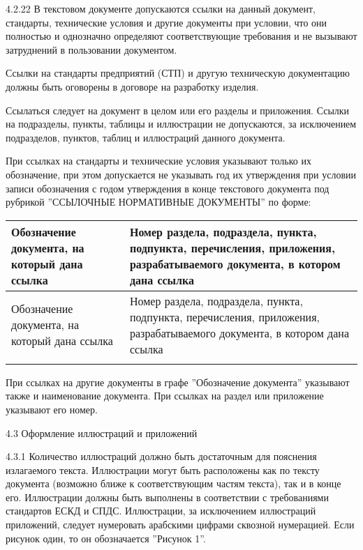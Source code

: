 4.2.22 В текстовом документе допускаются ссылки на данный документ, стандарты, технические условия и другие документы при условии, что они полностью и однозначно определяют соответствующие требования и не вызывают затруднений в пользовании документом.

Ссылки на стандарты предприятий (СТП) и другую техническую документацию должны быть оговорены в договоре на разработку изделия.

Ссылаться следует на документ в целом или его разделы и приложения. Ссылки на подразделы, пункты, таблицы и иллюстрации не допускаются, за исключением подразделов, пунктов, таблиц и иллюстраций данного документа.

При ссылках на стандарты и технические условия указывают только их обозначение, при этом допускается не указывать год их утверждения при условии записи обозначения с годом утверждения в конце текстового документа под рубрикой ''ССЫЛОЧНЫЕ НОРМАТИВНЫЕ ДОКУМЕНТЫ'' по форме:

\begin{longtable}{|p{60mm}|p{100mm}|}
  \hline
  \multicolumn{1}{|p{60mm}|}{\centering Обозначение документа, на который дана
ссылка} &
  \multicolumn{1}{p{100mm}|}{\centering Номер раздела, подраздела, пункта, подпункта, перечисления, приложения, разрабатываемого документа, в котором дана ссылка} \\\hline
  \endfirsthead
 \hline
  \multicolumn{1}{|p{60mm}|}{\centering Обозначение документа, на который дана
ссылка} &
  \multicolumn{1}{p{100mm}|}{\centering Номер раздела, подраздела, пункта, подпункта, перечисления, приложения, разрабатываемого документа, в котором дана ссылка} \\\hline
  \endhead
       &      \\ 
\end{longtable}

При ссылках на другие документы в графе ''Обозначение документа'' указывают также и наименование документа. При ссылках на раздел или приложение указывают его номер.

4.3 Оформление иллюстраций и приложений

4.3.1 Количество иллюстраций должно быть достаточным для пояснения излагаемого текста. Иллюстрации могут быть расположены как по тексту документа (возможно ближе к соответствующим частям текста), так и в конце его. Иллюстрации должны быть выполнены в соответствии с требованиями стандартов ЕСКД и СПДС.
Иллюстрации, за исключением иллюстраций приложений, следует нумеровать арабскими цифрами сквозной нумерацией. Если рисунок один, то он обозначается ''Рисунок 1''.

